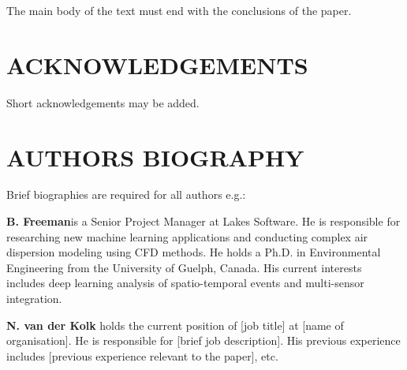 \documentclass[10pt,a4paper,twocolumn]{article}
\begin{document}
The main body of the text must end with the conclusions of the paper.

\section{ACKNOWLEDGEMENTS}

Short acknowledgements may be added.




\section{AUTHORS BIOGRAPHY}

Brief biographies are required for all authors e.g.:

\textbf{B. Freeman}is a Senior Project Manager at Lakes Software.  He is responsible for researching new machine learning applications and conducting complex air dispersion modeling using CFD methods.  He holds a Ph.D. in Environmental Engineering from the University of Guelph, Canada. His current interests includes deep learning analysis of spatio-temporal events and multi-sensor integration.

\textbf{N. van der Kolk} holds the current position of [job title] at [name of organisation].  He is responsible for [brief job description].  His previous experience includes [previous experience relevant to the paper], etc.

\end{document}
